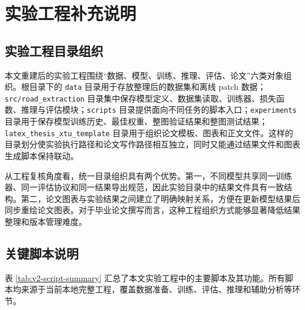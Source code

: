 
\appendix

\chapter{实验工程补充说明}
\label{app:v2-engineering}

\section{实验工程目录组织}
本文重建后的实验工程围绕“数据、模型、训练、推理、评估、论文”六类对象组织。根目录下的 \texttt{data} 目录用于存放整理后的数据集和离线 patch 数据；\texttt{src/road\_extraction} 目录集中保存模型定义、数据集读取、训练器、损失函数、推理与评估模块；\texttt{scripts} 目录提供面向不同任务的脚本入口；\texttt{experiments} 目录用于保存模型训练历史、最佳权重、整图验证结果和整图测试结果；\texttt{latex\_thesis\_xtu\_template} 目录用于组织论文模板、图表和正文文件。这样的目录划分使实验执行路径和论文写作路径相互独立，同时又能通过结果文件和图表生成脚本保持联动。

从工程复核角度看，统一目录组织具有两个优势。第一，不同模型共享同一训练器、同一评估协议和同一结果导出规范，因此实验目录中的结果文件具有一致结构。第二，论文图表与实验结果之间建立了明确映射关系，方便在更新模型结果后同步重绘论文图表。对于毕业论文撰写而言，这种工程组织方式能够显著降低结果整理和版本管理难度。

\section{关键脚本说明}
表 \ref{tab:v2-script-summary} 汇总了本文实验工程中的主要脚本及其功能。所有脚本均来源于当前本地完整工程，覆盖数据准备、训练、评估、推理和辅助分析等环节。

